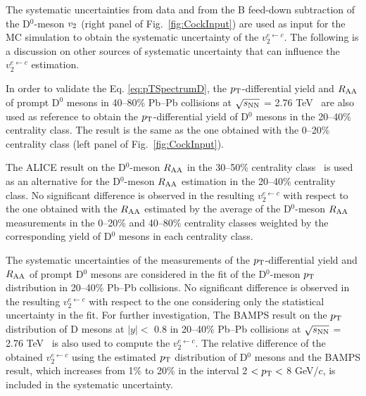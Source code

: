 \documentclass[11pt,a4paper]{article}
\providecommand{\pT}{$p_{\rm T}$ }
\providecommand{\raa}{$R_{\rm{\rm AA}}$ }
\providecommand{\snn}{$\sqrt{s_{\rm NN}}$ }
\begin{document}
The systematic uncertainties from data and from the B feed-down subtraction of the D$^{0}$-meson $v_{\rm 2}$ (right panel of Fig.~\ref{fig:CockInput}) are  used as input for the MC simulation to obtain the systematic uncertainty of the  $v_{2}^{e \leftarrow c}$. The following is a discussion on other sources of systematic uncertainty that can influence the $v_{2}^{e \leftarrow c}$ estimation.

In order to validate the Eq. \ref{eq:pTSpectrumD}, the $p_{\rm T}$-differential yield  and \raa  of  prompt D$^{0}$ mesons in 40--80\% Pb--Pb collisions at \snn = 2.76 TeV~\cite{ALICEDRPbPb} are also used as reference to obtain the  $p_{\rm T}$-differential yield of D$^{0}$ mesons in the 20--40\% centrality class. The result is the same as the one obtained with the 0--20\% centrality class (left panel of Fig.~\ref{fig:CockInput}).

The ALICE result on the D$^{0}$-meson $R_{\rm AA}$ in the 30--50\% centrality class~\cite{Abelev:2014ipa} is  used as an alternative for the D$^{0}$-meson \raa estimation in the 20--40\% centrality class. No significant difference is observed in the resulting $v_{2}^{e \leftarrow c}$ with respect to the one obtained with the $R_{\rm AA}$  estimated by the average of the D$^{0}$-meson $R_{\rm AA}$ measurements in the 0--20\% and 40--80\% centrality classes weighted by the  corresponding yield of D$^{0}$ mesons in each centrality class.

The systematic uncertainties of the measurements of the $p_{\rm T}$-differential yield  and \raa  of  prompt D$^{0}$ mesons are considered in the fit of the D$^{0}$-meson $p_{\rm T}$ distribution in 20--40\% Pb--Pb collisions. No significant difference is observed in the resulting $v_{2}^{e \leftarrow c}$ with respect to the one considering only the statistical uncertainty in the fit.  For further investigation, The BAMPS result on the \pT distribution of D mesons  at $|y| <$ 0.8 in 20--40\% Pb--Pb collisions at \snn = 2.76 TeV~\cite{Uphoff:2014hza,Uphoff:2012gb} is also used to compute the $v_{2}^{e \leftarrow c}$. The relative difference of the obtained $v_{2}^{e \leftarrow c}$ using the estimated \pT distribution of D$^{0}$ mesons and the BAMPS result, which increases from 1\% to 20\% in the  interval  2 $< p_{\rm T} <$ 8 GeV/$c$, is included in the systematic uncertainty. 
\end{document}
